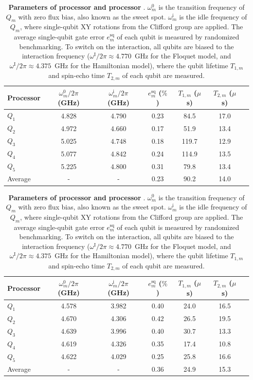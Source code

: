 \documentclass[aps,prx,reprint,twocolumn,superscriptaddress,floatfix,nofootinbib]{revtex4-2}
\begin{document}
\begin{table}[!htb]
    \centering
    \addtolength{\tabcolsep}{+2pt}
\caption{\small \textbf{Parameters of processor \MakeUppercase{} and processor \MakeUppercase{}}. $\omega^{0}_m$ is the transition frequency of $Q_m$ with zero flux bias, also known as the sweet spot. $\omega^{\text{i}}_m$ is the idle frequency of $Q_m$, where single-qubit XY rotations from the Clifford group are applied. The average single-qubit gate error $e^{\mathrm{sq}}_m$ of each qubit is measured by randomized benchmarking. To switch on the interaction, all qubits are biased to the interaction frequency ($\omega^{\mathrm{I}}/2\pi \approx 4.770$~GHz for the Floquet model, and $\omega^{\mathrm{I}}/2\pi \approx 4.375$~GHz for the Hamiltonian model), where the qubit lifetime $T_{1, m}$ and spin-echo time $T_{2, m}$ of each qubit are measured.
}

\begin{tabular}{l|c|cc|ccc}
        \hline
        \hline
        Processor \MakeUppercase{\romannumeral 1} & $\omega^{0}_m / 2\pi$ (GHz) & $\omega^{\text{i}}_m / 2\pi$ (GHz) & $e^{\mathrm{sq}}_m$ ($\%$) & $T_{1, m}$ ($\mu$s) & $T_{2, m}$ ($\mu$s) \\
        \hline
        $Q_{1 }$&   4.828&     4.790&    0.23&      84.5&     17.0\\
        $Q_{2 }$&   4.972&     4.660&    0.17&      51.9&     13.4\\
        $Q_{3 }$&   5.025&     4.748&    0.18&      119.7&     12.9\\
        $Q_{4 }$&   5.077&     4.842&    0.24&      114.9&     13.5\\
        $Q_{5 }$&   5.225&     4.800&    0.31&
        79.8&     13.4\\
        \hline
        Average &       -&         -&    0.23&      90.2&     14.0\\
        \hline
\end{tabular}

\begin{tabular}{l|c|cc|ccc}
        \hline
        \hline
        Processor \MakeUppercase{\romannumeral 2} & $\omega^{0}_m / 2\pi$ (GHz) & $\omega^{\text{i}}_m / 2\pi$ (GHz) & $e^{\mathrm{sq}}_m$ ($\%$) & $T_{1, m}$ ($\mu$s) & $T_{2, m}$ ($\mu$s) \\
        \hline
        $Q_{1 }$&   4.578&     3.982&    0.40&      24.0&     16.5\\
        $Q_{2 }$&   4.670&     4.306&    0.42&      26.5&     19.5\\
        $Q_{3 }$&   4.639&     3.996&    0.40&      30.7&     13.3\\
        $Q_{4 }$&   4.619&     4.326&    0.35&      17.4&     10.8\\
        $Q_{5 }$&   4.622&     4.029&    0.25&      25.8&     16.6\\
        \hline
        Average &       -&         -&    0.36&      24.9&     15.3\\
        \hline
\end{tabular}

\label{tab:dev_para_hamiltonian}
\end{table}
\end{document}
